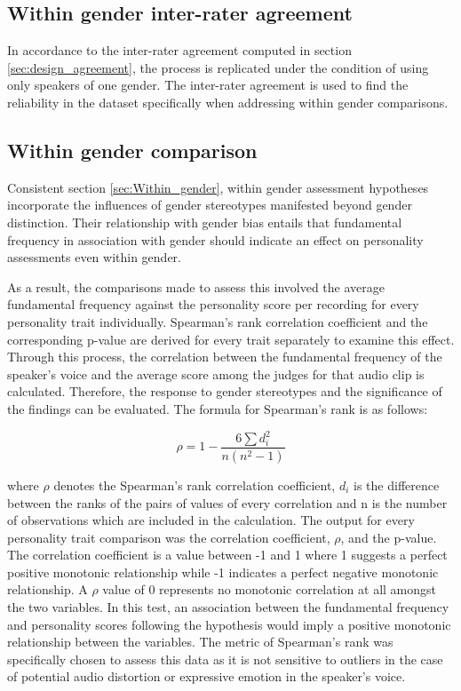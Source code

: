 \documentclass{l4proj}
\begin{document}
\subsection{Within gender inter-rater agreement}
In accordance to the inter-rater agreement computed in section \ref{sec:design_agreement}, the process is replicated under the condition of using only speakers of one gender. The inter-rater agreement is used to find the reliability in the dataset specifically when addressing within gender comparisons.

\subsection{Within gender comparison}

Consistent section \ref{sec:Within_gender}, within gender assessment hypotheses incorporate the influences of gender stereotypes manifested beyond gender distinction. Their relationship with gender bias entails that fundamental frequency in association with gender should indicate an effect on personality assessments even within gender. 

As a result, the comparisons made to assess this involved the average fundamental frequency against the personality score per recording for every personality trait individually. Spearman’s rank correlation coefficient and the corresponding p-value are derived for every trait separately to examine this effect. Through this process, the correlation between the fundamental frequency of the speaker’s voice and the average score among the judges for that audio clip is calculated.
Therefore, the response to gender stereotypes and the significance of the findings can be evaluated.
The formula for Spearman’s rank is as follows:

\begin{equation}
\rho = 1 - \frac{6\sum d_i^2}{n(n^2 - 1)}
\end{equation}

where $\rho$ denotes the Spearman’s rank correlation coefficient, $d_i$ is the difference between the ranks of the pairs of values of every correlation and n is the number of observations which are included in the calculation. The output for every personality trait comparison was the correlation coefficient, $\rho$, and the p-value. The correlation coefficient is a value between -1 and 1 where 1 suggests a perfect positive monotonic relationship while -1 indicates a perfect negative monotonic relationship. A $\rho$ value of 0 represents no monotonic correlation at all amongst the two variables. In this test, an association between the fundamental frequency and personality scores following the hypothesis would imply a positive monotonic relationship between the variables. The metric of Spearman's rank was specifically chosen to assess this data as it is not sensitive to outliers in the case of potential audio distortion or expressive emotion in the speaker's voice.
\end{document}
